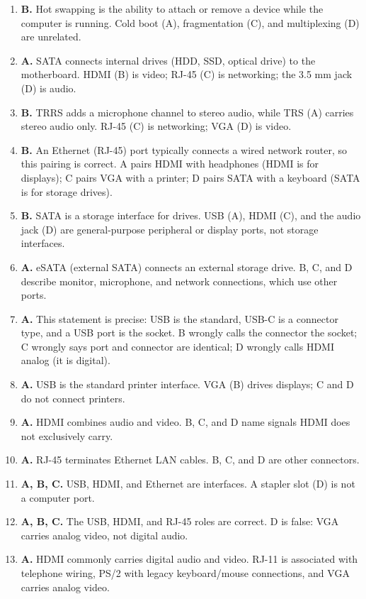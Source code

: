 \begin{enumerate}[label=\textbf{Q\arabic*.}, leftmargin=*]
  HDMI and DisplayPort. HDMI (B) and DisplayPort (C) are digital; USB-C (D)
  is a connector type, not the analog video port.
\item \textbf{B.} Hot swapping is the ability to attach or remove a device
  while the computer is running. Cold boot (A), fragmentation (C), and
  multiplexing (D) are unrelated.
\item \textbf{A.} SATA connects internal drives (HDD, SSD, optical drive) to
  the motherboard. HDMI (B) is video; RJ-45 (C) is networking; the 3.5 mm jack
  (D) is audio.
\item \textbf{B.} TRRS adds a microphone channel to stereo audio, while TRS
  (A) carries stereo audio only. RJ-45 (C) is networking; VGA (D) is video.
\item \textbf{B.} An Ethernet (RJ-45) port typically connects a wired network
  router, so this pairing is correct. A pairs HDMI with headphones (HDMI is
  for displays); C pairs VGA with a printer; D pairs SATA with a keyboard
  (SATA is for storage drives).
\item \textbf{B.} SATA is a storage interface for drives. USB (A), HDMI (C),
  and the audio jack (D) are general-purpose peripheral or display ports, not
  storage interfaces.
\item \textbf{A.} eSATA (external SATA) connects an external storage drive.
  B, C, and D describe monitor, microphone, and network connections, which use
  other ports.
\item \textbf{A.} This statement is precise: USB is the standard, USB-C is a
  connector type, and a USB port is the socket. B wrongly calls the connector
  the socket; C wrongly says port and connector are identical; D wrongly calls
  HDMI analog (it is digital).

\item \textbf{A.} USB is the standard printer interface. VGA (B) drives displays; C and D do not connect printers.
\item \textbf{A.} HDMI combines audio and video. B, C, and D name signals HDMI does not exclusively carry.
\item \textbf{A.} RJ-45 terminates Ethernet LAN cables. B, C, and D are other connectors.
\item \textbf{A, B, C.} USB, HDMI, and Ethernet are interfaces. A stapler slot (D) is not a computer port.
\item \textbf{A, B, C.} The USB, HDMI, and RJ-45 roles are correct. D is false: VGA carries analog video, not digital audio.
\item \textbf{A.} HDMI commonly carries digital audio and video. RJ-11 is associated with telephone wiring, PS/2 with legacy keyboard/mouse connections, and VGA carries analog video.


\end{enumerate}
